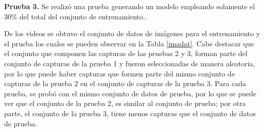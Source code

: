 \documentclass[twoside,spanish,ESP,MSc]{plantillaLabUPV}
\theoremstyle{definition}
\begin{document}
\checkmark\textbf{Prueba 3.} Se realizó una prueba generando un modelo empleando solamente el 30\% del total del conjunto de entrenamiento..


De los videos se obtuvo el conjunto de datos de imágenes para el entrenamiento y el prueba los cuales se pueden observar en la Tabla \ref{imadat}. Cabe destacar que el conjunto que componen las capturas de las pruebas 2 y 3, forman parte del conjunto de capturas de la prueba 1 y fueron seleccionadas de manera aleatoria, por lo que puede haber capturas que formen parte del mismo conjunto de capturas de la prueba 2 en el conjunto de capturas de la prueba 3. Para cada prueba, se probó con el mismo conjunto de datos de prueba, por lo que se puede ver que el conjunto de la prueba 2, es similar al conjunto de prueba; por otra parte, el conjunto de la prueba 3, tiene menos capturas que el conjunto de datos de prueba.
\end{document}
